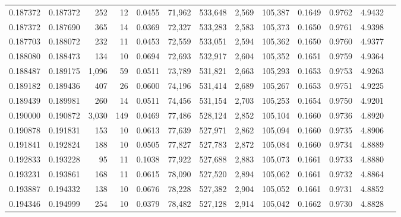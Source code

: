\begin{tabular}{rrrrrrrrrrrrr}
0.187372 & 0.187372 &   252 &  12 &                                     0.0455 &  71,962 & 533,648 &   2,569 & 105,387 & 0.1649 & 0.9762 & 4.9432 \\
0.187372 & 0.187690 &   365 &  14 &                                     0.0369 &  72,327 & 533,283 &   2,583 & 105,373 & 0.1650 & 0.9761 & 4.9398 \\
0.187703 & 0.188072 &   232 &  11 &                                     0.0453 &  72,559 & 533,051 &   2,594 & 105,362 & 0.1650 & 0.9760 & 4.9377 \\
0.188080 & 0.188473 &   134 &  10 &                                     0.0694 &  72,693 & 532,917 &   2,604 & 105,352 & 0.1651 & 0.9759 & 4.9364 \\
0.188487 & 0.189175 & 1,096 &  59 &                                     0.0511 &  73,789 & 531,821 &   2,663 & 105,293 & 0.1653 & 0.9753 & 4.9263 \\
0.189182 & 0.189436 &   407 &  26 &                                     0.0600 &  74,196 & 531,414 &   2,689 & 105,267 & 0.1653 & 0.9751 & 4.9225 \\
0.189439 & 0.189981 &   260 &  14 &                                     0.0511 &  74,456 & 531,154 &   2,703 & 105,253 & 0.1654 & 0.9750 & 4.9201 \\
0.190000 & 0.190872 & 3,030 & 149 &                                     0.0469 &  77,486 & 528,124 &   2,852 & 105,104 & 0.1660 & 0.9736 & 4.8920 \\
0.190878 & 0.191831 &   153 &  10 &                                     0.0613 &  77,639 & 527,971 &   2,862 & 105,094 & 0.1660 & 0.9735 & 4.8906 \\
0.191841 & 0.192824 &   188 &  10 &                                     0.0505 &  77,827 & 527,783 &   2,872 & 105,084 & 0.1660 & 0.9734 & 4.8889 \\
0.192833 & 0.193228 &    95 &  11 &                                     0.1038 &  77,922 & 527,688 &   2,883 & 105,073 & 0.1661 & 0.9733 & 4.8880 \\
0.193231 & 0.193861 &   168 &  11 &                                     0.0615 &  78,090 & 527,520 &   2,894 & 105,062 & 0.1661 & 0.9732 & 4.8864 \\
0.193887 & 0.194332 &   138 &  10 &                                     0.0676 &  78,228 & 527,382 &   2,904 & 105,052 & 0.1661 & 0.9731 & 4.8852 \\
0.194346 & 0.194999 &   254 &  10 &                                     0.0379 &  78,482 & 527,128 &   2,914 & 105,042 & 0.1662 & 0.9730 & 4.8828 \\

\end{tabular}
